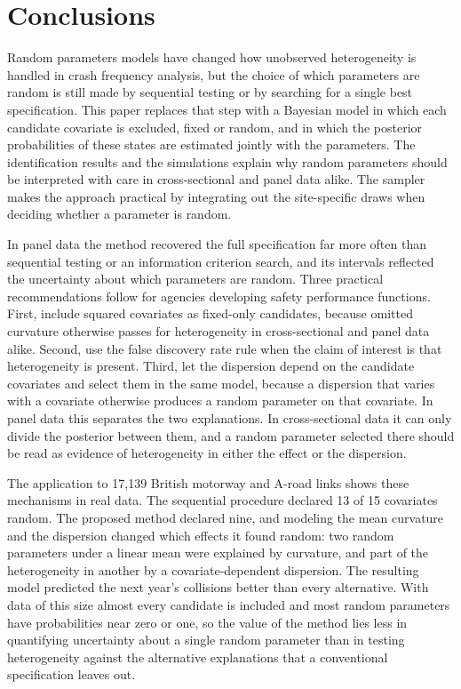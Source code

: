 \section{Conclusions}\label{sec:conclusion}

Random parameters models have changed how unobserved heterogeneity is handled in crash frequency analysis, but the choice of which parameters are random is still made by sequential testing or by searching for a single best specification. This paper replaces that step with a Bayesian model in which each candidate covariate is excluded, fixed or random, and in which the posterior probabilities of these states are estimated jointly with the parameters. The identification results and the simulations explain why random parameters should be interpreted with care in cross-sectional and panel data alike. The sampler makes the approach practical by integrating out the site-specific draws when deciding whether a parameter is random.

In panel data the method recovered the full specification far more often than sequential testing or an information criterion search, and its intervals reflected the uncertainty about which parameters are random. Three practical recommendations follow for agencies developing safety performance functions. First, include squared covariates as fixed-only candidates, because omitted curvature otherwise passes for heterogeneity in cross-sectional and panel data alike. Second, use the false discovery rate rule when the claim of interest is that heterogeneity is present. Third, let the dispersion depend on the candidate covariates and select them in the same model, because a dispersion that varies with a covariate otherwise produces a random parameter on that covariate. In panel data this separates the two explanations. In cross-sectional data it can only divide the posterior between them, and a random parameter selected there should be read as evidence of heterogeneity in either the effect or the dispersion.

The application to 17{,}139 British motorway and A-road links shows these mechanisms in real data. The sequential procedure declared 13 of 15 covariates random. The proposed method declared nine, and modeling the mean curvature and the dispersion changed which effects it found random: two random parameters under a linear mean were explained by curvature, and part of the heterogeneity in another by a covariate-dependent dispersion. The resulting model predicted the next year's collisions better than every alternative. With data of this size almost every candidate is included and most random parameters have probabilities near zero or one, so the value of the method lies less in quantifying uncertainty about a single random parameter than in testing heterogeneity against the alternative explanations that a conventional specification leaves out.
